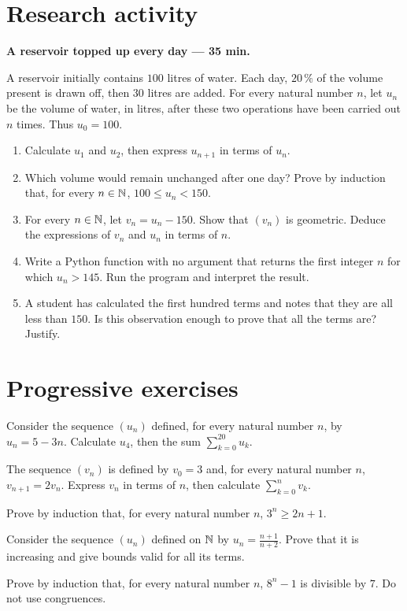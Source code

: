 \section{Research activity}\textbf{A reservoir topped up every day --- 35 min.}\par A reservoir initially contains $100$ litres of water. Each day, $20\,\%$ of the volume present is drawn off, then $30$ litres are added. For every natural number $n$, let $u_n$ be the volume of water, in litres, after these two operations have been carried out $n$ times. Thus $u_0=100$.
\begin{enumerate}\item Calculate $u_1$ and $u_2$, then express $u_{n+1}$ in terms of $u_n$.
\item Which volume would remain unchanged after one day? Prove by induction that, for every $n\in\mathbb N$, $100\le u_n<150$.
\item For every $n\in\mathbb N$, let $v_n=u_n-150$. Show that $(v_n)$ is geometric. Deduce the expressions of $v_n$ and $u_n$ in terms of $n$.
\item Write a Python function with no argument that returns the first integer $n$ for which $u_n>145$. Run the program and interpret the result.
\item A student has calculated the first hundred terms and notes that they are all less than $150$. Is this observation enough to prove that all the terms are? Justify.\end{enumerate}

\section{Progressive exercises}

Consider the sequence $(u_n)$ defined, for every natural number $n$, by $u_n=5-3n$. Calculate $u_4$, then the sum $\displaystyle\sum_{k=0}^{20}u_k$.

The sequence $(v_n)$ is defined by $v_0=3$ and, for every natural number $n$, $v_{n+1}=2v_n$. Express $v_n$ in terms of $n$, then calculate $\displaystyle\sum_{k=0}^n v_k$.

Prove by induction that, for every natural number $n$, $3^n\ge2n+1$.

Consider the sequence $(u_n)$ defined on $\mathbb N$ by $u_n=\frac{n+1}{n+2}$. Prove that it is increasing and give bounds valid for all its terms.

Prove by induction that, for every natural number $n$, $8^n-1$ is divisible by $7$. Do not use congruences.

